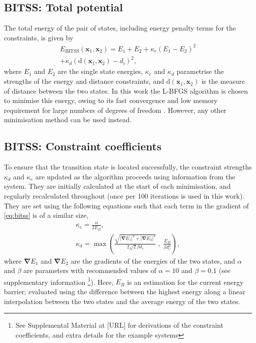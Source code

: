 \documentclass[twocolumn,10pt]{revtex4-2}
\newcommand{\abs}[1]{\left| #1 \right|}
\newcommand{\grad}{\bm{\nabla}}
\begin{document}
\subsection{BITSS: Total potential}
The total energy of the pair of states, including energy penalty terms for the constraints, is given by
\begin{multline}\label{eq:bitss}
  E_\text{BITSS}(\bm{x}_1, \bm{x}_2) = E_1 + E_2
    + \kappa_e \left( E_1 - E_2 \right) ^2 \\
    + \kappa_d \left( \mathrm{d}(\bm{x}_1, \bm{x}_2) - d_i \right) ^2,
\end{multline}
where $E_1$ and $E_2$ are the single state energies, $\kappa_e$ and $\kappa_d$ parametrise the strengths of the energy and distance constraints, and $\mathrm{d}(\bm{x}_1, \bm{x}_2)$ is the measure of distance between the two states.
In this work the L-BFGS algorithm is chosen to minimise this energy, owing to its fast convergence and low memory requirement for large numbers of degrees of freedom \cite{Liu1989}.
However, any other minimisation method can be used instead.

\subsection{BITSS: Constraint coefficients}
To ensure that the transition state is located successfully, the constraint strengths $\kappa_d$ and $\kappa_e$ are updated as the algorithm proceeds using information from the system.
They are initially calculated at the start of each minimisation, and regularly recalculated throughout (once per 100 iterations is used in this work).
They are set using the following equations such that each term in the gradient of \cref{eq:bitss} is of a similar size,
\begin{gather}
  \kappa_e = \frac {\alpha} {2 E_B},
  \label{eq:ke}
  \\
  \kappa_d = \max \left(
    \frac {\sqrt{\abs{\grad E_1}^2 + \abs{\grad E_2}^2}} {2\sqrt{2} \beta d_i} \; , \;
    \frac{E_B}{\beta d_i^2} \right),
  \label{eq:kd}
\end{gather}
where $\grad E_1$ and $\grad E_2$ are the gradients of the energies of the two states, and $\alpha$ and $\beta$ are parameters with recommended values of $\alpha = 10$ and $\beta = 0.1$ (see supplementary information \footnote{See Supplemental Material at [URL] for derivations of the constraint coefficients, and extra details for the example systems}).
Here, $E_B$ is an estimation for the current energy barrier; evaluated using the difference between the highest energy along a linear interpolation between the two states and the average energy of the two states.
\end{document}
